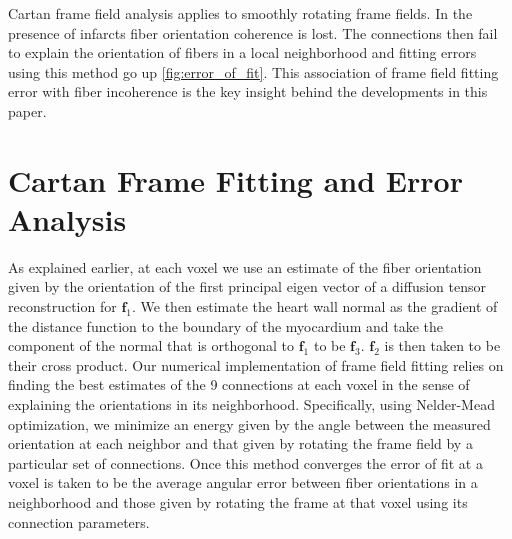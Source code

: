 Cartan frame field analysis applies to smoothly rotating frame fields. In the presence of infarcts fiber orientation coherence is lost. The connections then fail to explain the orientation of fibers in a local neighborhood and fitting errors using this method go up \ref{fig:error_of_fit}. This association of frame field fitting error with fiber incoherence is the key insight behind the developments in this paper.

\section{Cartan Frame Fitting and Error Analysis}

As explained earlier, at each voxel we use an estimate of the fiber orientation given by the orientation of the first principal eigen vector of a diffusion tensor reconstruction for $\mathbf{f}_1$. We then estimate the heart wall normal as the gradient of the distance function to the boundary of the myocardium and take the component of the normal that is orthogonal to $\mathbf{f}_1$ to be $\mathbf{f}_3$. $\mathbf{f}_2$ is then taken to be their cross product. Our numerical implementation of frame field fitting relies on finding the best estimates of the 9 connections at each voxel in the sense of explaining the orientations in its neighborhood. Specifically, using Nelder-Mead optimization, we minimize an energy given by the angle between the measured orientation at each neighbor and that given by rotating the frame field by a particular set of connections. Once this method converges the error of fit at a voxel is taken to be the average angular error between fiber orientations in a neighborhood and those given by rotating the frame at that voxel using its connection parameters.